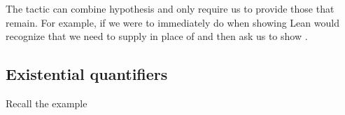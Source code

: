 \documentclass[letterpaper,10pt,english]{sphinxmanual}
\begin{document}
\sphinxAtStartPar
The tactic  can combine hypothesis and
only require us to provide those that remain.
For example, if we were to immediately do 
when showing 
Lean would recognize that we need to supply 
in place of  and then ask us to show .

\begin{sphinxVerbatim}[commandchars=\\\{\}]
                      
   
    
   
    
   
\end{sphinxVerbatim}


\subsection{Existential quantifiers}
\label{\detokenize{first_order_logic_in_lean:existential-quantifiers}}
\sphinxAtStartPar
Recall the example

\begin{sphinxVerbatim}[commandchars=\\\{\}]
              
          
  
         
       
        
\end{sphinxVerbatim}
\end{document}
